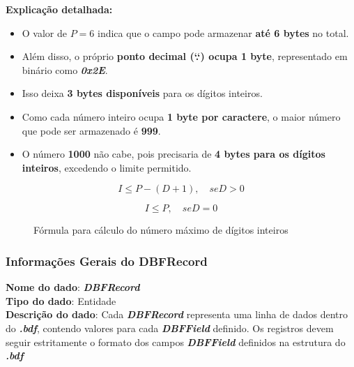 \begin{itemize}
    \subitem \textbf{Explicação detalhada:}  
    \begin{itemize}
        \item O valor de \( P = 6 \) indica que o campo pode armazenar \textbf{até 6 bytes} no total.  
        \item Além disso, o próprio \textbf{ponto decimal (`.`) ocupa 1 byte}, representado em binário como \textit{\textbf{0x2E}}.  
        \item Isso deixa \textbf{3 bytes disponíveis} para os dígitos inteiros.  
        \item Como cada número inteiro ocupa \textbf{1 byte por caractere}, o maior número que pode ser armazenado é \textbf{999}.  
        \item O número \textbf{1000} não cabe, pois precisaria de \textbf{4 bytes para os dígitos inteiros}, excedendo o limite permitido.  
    \end{itemize}
    \begin{figure}[H]
        \begin{equation}
            I \leq P - (D + 1), \quad {se } D > 0
            \end{equation}
            
            \begin{equation}
            I \leq P, \quad {se } D = 0
        \end{equation}
        \caption{Fórmula para cálculo do número máximo de dígitos inteiros}
    \end{figure}
\end{itemize}



\subsubsection{Informações Gerais do DBFRecord}
\textbf{Nome do dado}: \textit{\textbf{DBFRecord}} \\  
\textbf{Tipo do dado}: Entidade \\  
\textbf{Descrição do dado}: Cada \textit{\textbf{DBFRecord}} representa uma linha de dados dentro do \textit{\textbf{.bdf}}, contendo valores para cada \textit{\textbf{DBFField}} definido. Os registros devem seguir estritamente o formato dos campos \textit{\textbf{DBFField}} definidos na estrutura do \textit{\textbf{.bdf}} \\  

